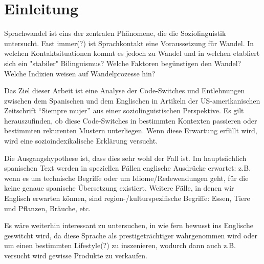 \section{Einleitung}

\begin{comment}
* ca 3/4 Seiten
* Untersuchungsgegenstand
* Erkenntnisinteresse
* Forschungsstand
* Vorgehensweise: also Section 2 macht blabla, Section 3 blablup, ....
* Ergebnisse können/sollen angedeuten werden
\end{comment}



Sprachwandel ist eins der zentralen Phänomene, die die Soziolinguistik untersucht.
Fast immer(?) ist Sprachkontakt eine Voraussetzung für Wandel.
In welchen Kontaktsituationen kommt es jedoch zu Wandel und in welchen etabliert sich ein "stabiler" Bilinguismus?
Welche Faktoren begünstigen den Wandel?
Welche Indizien weisen auf Wandelprozesse hin?


Das Ziel dieser Arbeit ist eine Analyse der Code-Switches und Entlehnungen zwischen dem Spanischen und dem Englischen in Artikeln der US-amerikanischen Zeitschrift ``Siempre mujer'' aus einer soziolinguistischen Perspektive.
Es gilt herauszufinden, ob diese Code-Switches in bestimmten Kontexten passieren oder bestimmten rekurenten Mustern unterliegen.
Wenn diese Erwartung erfüllt wird, wird eine sozioindexikalische Erklärung versucht.

Die Ausgangshypothese ist, dass dies sehr wohl der Fall ist.
Im hauptsächlich spanischen Text werden in speziellen Fällen englische Ausdrücke erwartet:
z.B. wenn es um technische Begriffe oder um Idiome/Redewendungen geht, für die keine genaue spanische Übersetzung existiert.
Weitere Fälle, in denen wir Englisch erwarten können, sind region-/kulturspezifische Begriffe: Essen, Tiere und Pflanzen, Bräuche, etc.

Es wäre weiterhin interessant zu untersuchen, in wie fern bewusst ins Englische geswitcht wird, da diese Sprache als prestigeträchtiger wahrgenommen wird oder um einen bestimmten Lifestyle(?) zu inszenieren, wodurch dann auch z.B. versucht wird gewisse Produkte zu verkaufen.

